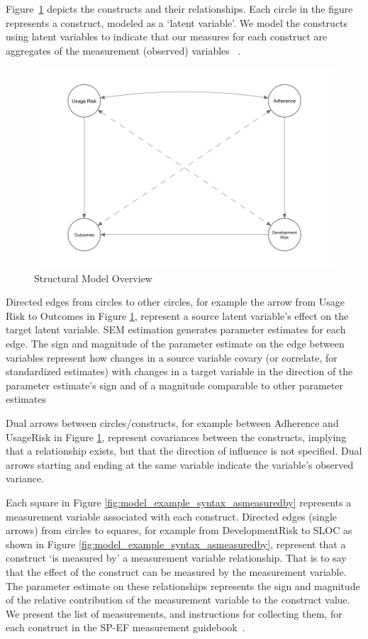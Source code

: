 Figure~\ref{fig:model_constructs} depicts the constructs and their relationships.  Each circle in the figure represents a construct, modeled as a `latent variable'. We model the constructs using latent variables to indicate that our measures for each construct are aggregates of the measurement (observed) variables ~\cite{kline2015principles,borsboom2008latent}. 

 \begin{figure}
 	\includegraphics[width=\columnwidth]{modelzeroB.png}
 	\caption{Structural Model Overview}
 	\label{fig:model_constructs}
 \end{figure}
 
Directed edges from circles to other circles, for example the arrow from Usage Risk to Outcomes in Figure \ref{fig:model_constructs}, represent a source latent variable's effect on the target latent variable. SEM estimation generates parameter estimates for each edge. The sign and magnitude of the parameter estimate on the edge between variables represent how changes in a source variable covary (or correlate, for standardized estimates) with changes in a target variable in the direction of the parameter estimate's sign and of a magnitude comparable to other parameter estimates

Dual arrows between circles/constructs, for example between Adherence and UsageRisk in Figure \ref{fig:model_constructs}, represent covariances between the constructs, implying that a relationship exists, but that the direction of influence is not specified. Dual arrows starting and ending at the same variable indicate the variable's observed variance. 

Each square in Figure \ref{fig:model_example_syntax_asmeasuredby} represents a measurement variable associated with each construct. Directed edges (single arrows) from circles to squares, for example from DevelopmentRisk to SLOC as shown in Figure \ref{fig:model_example_syntax_asmeasuredby}, represent that a construct `is measured by' a measurement variable relationship. That is to say that the effect of the construct can be measured by the measurement variable. The parameter estimate on these relationships represents the sign and magnitude of the relative contribution of the measurement variable to the construct value. We present the list of measurements, and instructions for collecting them, for each construct in the SP-EF measurement guidebook~\cite{morrison2016spefguide}.

